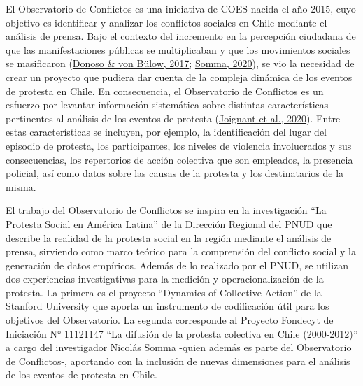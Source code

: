\documentclass[
  12pt,
]{article}
\begin{document}
El Observatorio de Conflictos es una iniciativa de COES nacida el año
2015, cuyo objetivo es identificar y analizar los conflictos sociales en
Chile mediante el análisis de prensa. Bajo el contexto del incremento en
la percepción ciudadana de que las manifestaciones públicas se
multiplicaban y que los movimientos sociales se masificaron
(\protect\hyperlink{ref-donosoSocialMovementsChile2017a}{Donoso \& von
Bülow, 2017};
\protect\hyperlink{ref-sommaSocialMovementsLatin2020}{Somma, 2020}), se
vio la necesidad de crear un proyecto que pudiera dar cuenta de la
compleja dinámica de los eventos de protesta en Chile. En consecuencia,
el Observatorio de Conflictos es un esfuerzo por levantar información
sistemática sobre distintas características pertinentes al análisis de
los eventos de protesta
(\protect\hyperlink{ref-joignantInformeAnualObservatorio2020}{Joignant
et al., 2020}). Entre estas características se incluyen, por ejemplo, la
identificación del lugar del episodio de protesta, los participantes,
los niveles de violencia involucrados y sus consecuencias, los
repertorios de acción colectiva que son empleados, la presencia
policial, así como datos sobre las causas de la protesta y los
destinatarios de la misma.

El trabajo del Observatorio de Conflictos se inspira en la investigación
``La Protesta Social en América Latina'' de la Dirección Regional del
PNUD que describe la realidad de la protesta social en la región
mediante el análisis de prensa, sirviendo como marco teórico para la
comprensión del conflicto social y la generación de datos empíricos.
Además de lo realizado por el PNUD, se utilizan dos experiencias
investigativas para la medición y operacionalización de la protesta. La
primera es el proyecto ``Dynamics of Collective Action'' de la Stanford
University que aporta un instrumento de codificación útil para los
objetivos del Observatorio. La segunda corresponde al Proyecto Fondecyt
de Iniciación N° 11121147 ``La difusión de la protesta colectiva en
Chile (2000-2012)'' a cargo del investigador Nicolás Somma -quien además
es parte del Observatorio de Conflictos-, aportando con la inclusión de
nuevas dimensiones para el análisis de los eventos de protesta en Chile.
\end{document}
